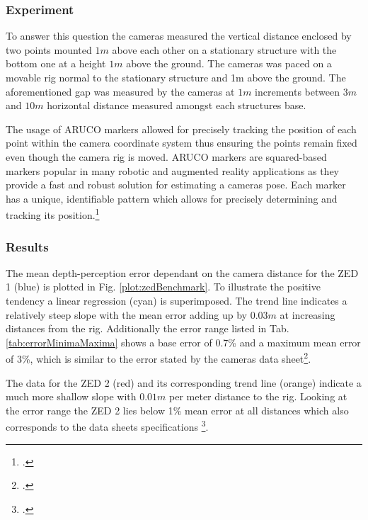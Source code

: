 \subsubsection{Experiment}
To answer this question the cameras measured the vertical distance enclosed by two points mounted $1m$ above each other on a stationary structure with the bottom one at a height $1m$ above the ground. 
The cameras was paced on a movable rig normal to the stationary structure and 1m above the ground.  The aforementioned gap was measured by the cameras at $1m$ increments between $3m$ and $10m$ horizontal distance measured amongst each structures base. 

The usage of ARUCO markers allowed for precisely tracking the position of each point within the camera coordinate system thus ensuring the points remain fixed even though the camera rig is moved. 
ARUCO markers are squared-based markers popular in many robotic and augmented reality applications as they provide a fast and robust solution for estimating a cameras pose. Each marker has a unique, identifiable pattern which allows for precisely determining and tracking its position.\footcite{jurado2015} 

\subsubsection{Results}

The mean depth-perception error dependant on the camera distance for the ZED 1 (blue) is plotted in Fig. \ref{plot:zedBenchmark}. To illustrate the positive tendency a linear regression (cyan) is superimposed. The trend line indicates a relatively steep slope with the mean error adding up by $0.03m$ at increasing distances from the rig. Additionally the error range listed in Tab. \ref{tab:errorMinimaMaxima} shows a base error of 0.7\% and a maximum mean error of 3\%, which is similar to the error stated by the cameras data sheet\footcite{zed1Datasheet}.

The data for the ZED 2 (red) and its corresponding trend line (orange) indicate a much more shallow slope with $0.01m$ per meter distance to the rig. Looking at the error range the ZED 2 lies below 1\% mean error at all distances which also corresponds to the data sheets specifications \footcite{zed2Datasheet}.



